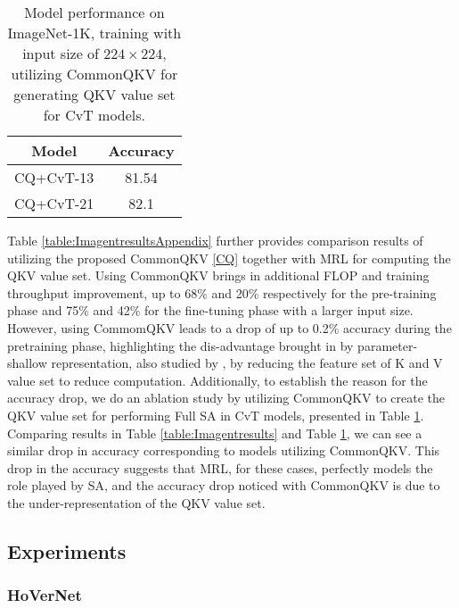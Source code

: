 \documentclass{article}
\begin{document}
\begin{table}[htbp]
  \centering
  \caption{Model performance on ImageNet-1K, training with input size of $224 \times 224$, utilizing CommonQKV for generating QKV value set for CvT models.}\label{table:CQCvT}
    \begin{tabular}{c|c}
    \toprule
    Model & Accuracy \\
    \midrule
    CQ+CvT-13 & 81.54 \\
    CQ+CvT-21 & 82.1 \\
    \end{tabular}\end{table}

Table \ref{table:ImagentresultsAppendix} further provides comparison results of utilizing the proposed CommonQKV \ref{CQ} together with MRL for computing the QKV value set. Using CommonQKV brings in additional FLOP and training throughput improvement, up to 68\% and 20\% respectively for the pre-training phase and 75\% and 42\% for the fine-tuning phase with a larger input size. However, using CommomQKV leads to a drop of up to 0.2\% accuracy during the pretraining phase, highlighting the dis-advantage brought in by parameter-shallow representation, also studied by \cite{DBLP:journals/corr/CvT}, by reducing the feature set of K and V value set to reduce computation. Additionally, to establish the reason for the accuracy drop, we do an ablation study by utilizing CommonQKV to create the QKV value set for performing Full SA in CvT models, presented in Table \ref{table:CQCvT}. Comparing results in Table \ref{table:Imagentresults} and Table \ref{table:CQCvT}, we can see a similar drop in accuracy corresponding to models utilizing CommonQKV. This drop in the accuracy suggests that MRL, for these cases, perfectly models the role played by SA, and the accuracy drop noticed with CommonQKV is due to the under-representation of the QKV value set. 

\subsection{Experiments}
\subsubsection{HoVerNet} \label{Appen:HoverNet}
\end{document}
